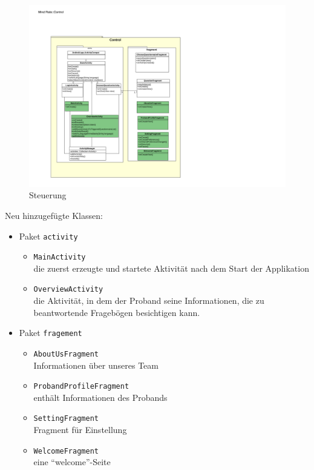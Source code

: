 \documentclass[a4paper]{scrreprt}
\begin{document}
                \vspace*{1cm}
                \begin{figure}[H]
                    \centering
                    \includegraphics[scale = 1.0]{Control.pdf}
                    \caption{Steuerung}
                \end{figure}


                Neu hinzugefügte Klassen:
                \begin{itemize}
                    \item Paket \texttt{activity}
                        \begin{itemize}
                            \item \texttt{MainActivity} \\ die zuerst erzeugte und startete Aktivität nach dem Start der Applikation
                            \item \texttt{OverviewActivity} \\ die Aktivität, in dem der Proband seine Informationen, die zu beantwortende Fragebögen besichtigen kann.
                        \end{itemize}
                    \item Paket \texttt{fragement}
                        \begin{itemize}
                            \item \texttt{AboutUsFragment} \\ Informationen über unseres Team
                            \item \texttt{ProbandProfileFragment} \\ enthält Informationen des Probands
                            \item \texttt{SettingFragment} \\ Fragment für Einstellung
                            \item \texttt{WelcomeFragment} \\ eine ``welcome''-Seite
                        \end{itemize}
                \end{itemize}
\end{document}
